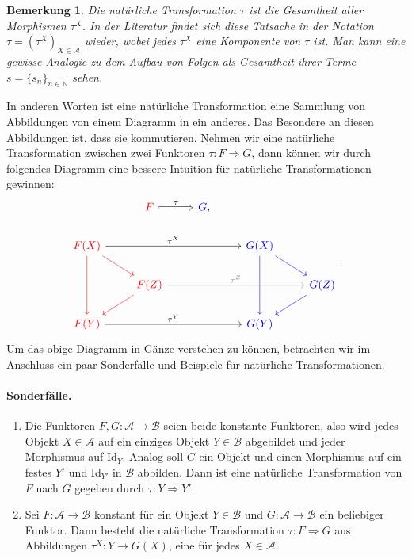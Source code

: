 \documentclass{article}
\newtheorem{remark}{Bemerkung}[section]
\begin{document}
\begin{remark}
Die natürliche Transformation $\tau$ ist die Gesamtheit aller Morphismen $\tau^{X}$. In der Literatur findet sich diese Tatsache in der Notation $\tau = (\tau^{X})_{X \in \mathcal{A}}$ wieder, wobei jedes $\tau^{X}$ eine Komponente von $\tau$ ist. Man kann eine gewisse Analogie zu dem Aufbau von Folgen als Gesamtheit ihrer Terme $s = \{s_n\}_{n \in \mathbb{N}}$ sehen.
\end{remark}

In anderen Worten ist eine natürliche Transformation eine Sammlung von Abbildungen von einem Diagramm in ein anderes. Das Besondere an diesen Abbildungen ist, dass sie kommutieren. Nehmen wir eine natürliche Transformation zwischen zwei Funktoren $\tau: F \Longrightarrow G$, dann können wir durch folgendes Diagramm eine bessere Intuition für natürliche Transformationen gewinnen:
\begin{equation}
	\begin{tikzcd}
	                                                   & {\color{red}F} \arrow[r, Rightarrow, "\tau"]                 & {\color{blue}G}, &                            &                 \\
	{\color{red}F(X)} \arrow[dd, red] \arrow[rd, red] \arrow[rrr, "\tau^{X}"] &                                         &   & {\color{blue}G(X)} \arrow[rd, blue] \arrow[dd, blue] &                 \\
	                                                   & {\color{red}F(Z)} \arrow[ld, red] \arrow[rrr, "\tau^{Z}", gray] &   &                            & {\color{blue}G(Z)} \arrow[ld, blue] \\
	{\color{red}F(Y)} \arrow[rrr, "\tau^{Y}"]                       &                                         &   & {\color{blue}G(Y)}                       &                
	\end{tikzcd}.
\end{equation}
Um das obige Diagramm in Gänze verstehen zu können, betrachten wir im Anschluss ein paar Sonderfälle und Beispiele für natürliche Transformationen.

\paragraph{Sonderfälle.}
\begin{enumerate}
	\item Die Funktoren $F,G: \mathcal{A} \rightarrow \mathcal{B}$ seien beide konstante Funktoren, also wird jedes Objekt $X \in \mathcal{A}$ auf ein einziges Objekt $Y \in \mathcal{B}$ abgebildet und jeder Morphismus auf $\text{Id}_{Y}$. Analog soll $G$ ein Objekt und einen Morphismus auf ein festes $Y'$ und $\text{Id}_{Y'}$ in $\mathcal{B}$ abbilden. Dann ist eine natürliche Transformation von $F$ nach $G$ gegeben durch $\tau: Y \Longrightarrow Y'$.
	\item Sei $F: \mathcal{A} \rightarrow \mathcal{B}$ konstant für ein Objekt $Y \in \mathcal{B}$ und $G: \mathcal{A} \rightarrow \mathcal{B}$ ein beliebiger Funktor. Dann besteht die natürliche Transformation $\tau: F \Longrightarrow G$ aus Abbildungen $\tau^{X}: Y \rightarrow G(X)$, eine für jedes $X \in \mathcal{A}$. 
\end{enumerate}
\end{document}
